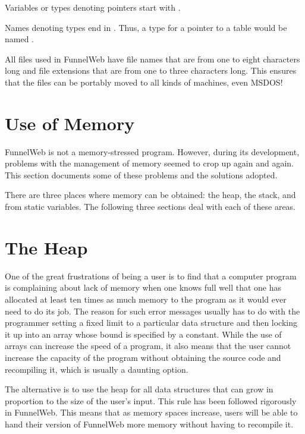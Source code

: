  Variables or types denoting
pointers start with .

 Names denoting types end in .
Thus, a type for a pointer to a table would be named
.

 All files
used in FunnelWeb have file names that are
from one to eight characters long and file extensions that are from one to
three characters long. This ensures that the files can be portably moved
to all kinds of machines, even MSDOS!

\section{Use of Memory}

FunnelWeb is not a memory-stressed program. However, during its development,
problems with the management of memory seemed to crop up again and again.
This section documents some of these problems and the solutions adopted.

There are three places where memory can be obtained: the heap, the stack,
and from static variables. The following three sections deal with each
of these areas.

\section{The Heap}

One of the great frustrations of being a user is to find that a computer
program is complaining about lack of memory when one knows full well that
one has allocated at least ten times as much memory to the program as it
would ever need to do its job. The reason for such error messages usually
has to do with the programmer setting a fixed  limit to
a particular data structure and then locking it up into an array whose
bound is specified by a constant. While the use of arrays can increase the
speed of a program, it also means that the user cannot increase the capacity
of the program without obtaining the source code and recompiling it,
which is usually a daunting option.

The alternative is to use the heap for all data structures that can
grow in proportion to the size of the user's input. This rule has been
followed rigorously in FunnelWeb. This means that as memory spaces
increase, users will be able to hand their version of FunnelWeb more
memory without having to recompile it.

